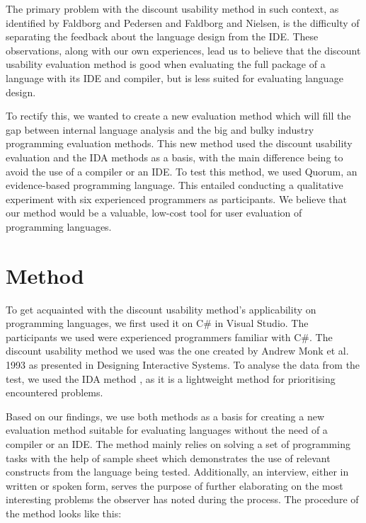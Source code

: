 \documentclass[preprint,10pt]{sigplanconf}
\begin{document}
The primary problem with the discount usability method in such context, as identified by Faldborg and Pedersen and Faldborg and Nielsen, is the difficulty of separating the feedback about the language design from the IDE.
These observations, along with our own experiences, lead us to believe that the discount usability evaluation method is good when evaluating the full package of a language with its IDE and compiler, but is less suited for evaluating language design.

To rectify this, we wanted to create a new evaluation method which will fill the gap between 
internal language analysis and the big and bulky industry programming evaluation methods\cite{AliceCS1}\cite{BlockOrNot}\cite{FromScratch}. This new method used the discount usability evaluation and the IDA methods as a basis, with the main difference being to avoid the use of a compiler or an IDE. To test this method, we used Quorum, an evidence-based programming language. This entailed conducting a qualitative experiment with six experienced programmers as participants.
We believe that our method would be a valuable, low-cost tool for user evaluation of programming languages. 

\section{Method}
To get acquainted with the discount usability method’s applicability on programming languages, we first used it on C\# in Visual Studio. The participants we used were experienced programmers familiar with C\#. The discount usability method we used was the one created by Andrew Monk et al. 1993 as presented in Designing Interactive Systems\cite{CooperativeEval}. To analyse the data from the test, we used the IDA method \cite{IDA}, as it is a lightweight method for prioritising encountered problems.

Based on our findings, we use both methods as a basis for creating a new evaluation method suitable for evaluating languages without the need of a compiler or an IDE. The method mainly relies on solving a set of programming tasks with the help of sample sheet which demonstrates the use of relevant constructs from the language being tested. Additionally, an interview, either in written or spoken form, serves the purpose of further elaborating on the most interesting problems the observer has noted during the process. The procedure of the method looks like this:
\end{document}
